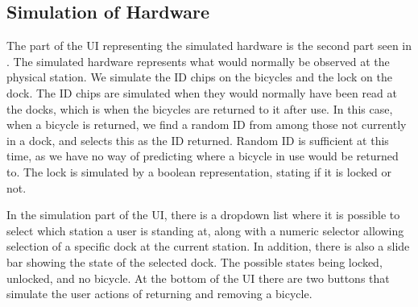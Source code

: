 \subsection{Simulation of Hardware}
The part of the UI representing the simulated hardware is the second part seen in .
The simulated hardware represents what would normally be observed at the physical station.
We simulate the ID chips on the bicycles and the lock on the dock.
The ID chips are simulated when they would normally have been read at the docks, which is when the bicycles are returned to it after use.
In this case, when a bicycle is returned, we find a random ID from among those not currently in a dock, and selects this as the ID returned.
Random ID is sufficient at this time, as we have no way of predicting where a bicycle in use would be returned to.
The lock is simulated by a boolean representation, stating if it is locked or not.

In the simulation part of the UI, there is a dropdown list where it is possible to select which station a user is standing at, along with a numeric selector allowing selection of a specific dock at the current station.
In addition, there is also a slide bar showing the state of the selected dock.
The possible states being locked, unlocked, and no bicycle.
At the bottom of the UI there are two buttons that simulate the user actions of returning and removing a bicycle.

